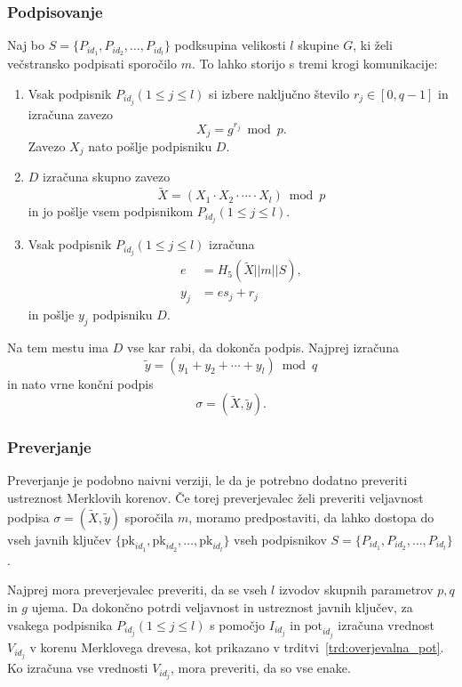 \documentclass[isrm2, tisk]{fmfdelo}
\begin{document}
\subsubsection{Podpisovanje}
Naj bo $S = \{P_{id_1}, P_{id_2}, \dots, P_{id_l}\}$ podksupina velikosti $l$ skupine $G$, ki želi 
večstransko podpisati sporočilo $m$. To lahko storijo s tremi krogi komunikacije:
\begin{enumerate}
    \item Vsak podpisnik $P_{id_j} (1 \le j \le l)$ si izbere naključno število $r_j \in [0, q - 1]$ 
        in izračuna zavezo
        $$ 
        X_j = g^{r_j} \bmod p.
        $$
        Zavezo $X_j$ nato pošlje podpisniku $D$.
    \item $D$ izračuna skupno zavezo
        $$ 
        \tilde{X} = (X_1 \cdot X_2 \cdot \cdots \cdot X_l) \bmod p
        $$
        in jo pošlje vsem podpisnikom $P_{id_j} (1 \le j \le l)$.
    \item Vsak podpisnik $P_{id_j} (1 \le j \le l)$ izračuna
        \begin{align*}
            e &= H_5(\tilde{X} || m || S), \\
            y_j &= e s_j + r_j
        \end{align*}
        in pošlje $y_j$ podpisniku $D$.
\end{enumerate}
Na tem mestu ima $D$ vse kar rabi, da dokonča podpis. Najprej izračuna
$$
\tilde{y} = (y_1 + y_2 + \cdots + y_l) \bmod q
$$
in nato vrne končni podpis
$$
\sigma = (\tilde{X}, \tilde{y}).
$$

\subsubsection{Preverjanje}
Preverjanje je podobno naivni verziji, le da je potrebno dodatno preveriti ustreznost Merklovih
korenov. Če torej preverjevalec želi preveriti veljavnost podpisa $\sigma = (\tilde{X}, \tilde{y})$
sporočila $m$, moramo predpostaviti, da lahko dostopa do vseh javnih ključev $\{\text{pk}_{id_1},
\text{pk}_{id_2}, \dots, \text{pk}_{id_l}\}$ vseh podpisnikov $S = \{P_{id_1}, P_{id_2}, \dots, 
P_{id_l}\}$.

Najprej mora preverjevalec preveriti, da se vseh $l$ izvodov skupnih parametrov $p, q$ in $g$ ujema.
Da dokončno potrdi veljavnost in ustreznost javnih ključev, za vsakega podpisnika $P_{id_j} (1 \le
j \le l)$ s pomočjo $I_{id_j}$ in $\text{pot}_{id_j}$ izračuna vrednost $V_{id_j}$ v korenu 
Merklovega drevesa, kot prikazano v trditvi~\ref{trd:overjevalna_pot}. Ko izračuna vse vrednosti
$V_{id_j}$, mora preveriti, da so vse enake. 
\end{document}
